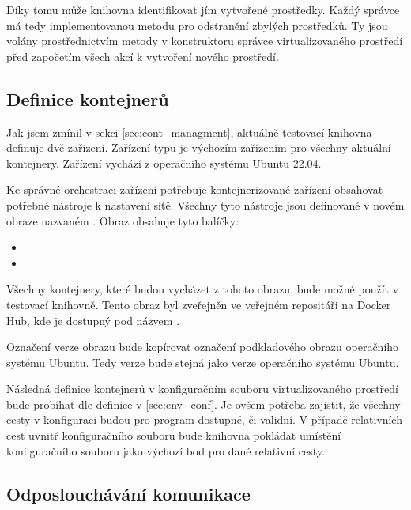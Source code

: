 Díky tomu může knihovna identifikovat jím vytvořené prostředky. Každý správce má tedy implementovanou metodu pro odstranění zbylých prostředků. Ty jsou volány prostřednictvím metody  v konstruktoru správce virtualizovaného prostředí před započetím všech akcí k vytvoření nového prostředí.

\subsection{Definice kontejnerů}

Jak jsem zmínil v sekci \ref{sec:cont_managment}, aktuálně testovací knihovna definuje dvě zařízení. Zařízení typu  je výchozím zařízením pro všechny aktuální kontejnery. Zařízení vychází z operačního systému Ubuntu 22.04. 

Ke správné orchestraci zařízení potřebuje kontejnerizované zařízení obsahovat potřebné nástroje k nastavení sítě. Všechny tyto nástroje jsou definované v novém obraze nazvaném . Obraz obsahuje tyto balíčky:

\begin{itemize}
    \item {}
    \item {}
\end{itemize}

Všechny kontejnery, které budou vycházet z tohoto obrazu, bude možné použít v testovací knihovně. Tento obraz byl zveřejněn ve veřejném repositáři na Docker Hub\cite{docker_hub}, kde je dostupný pod názvem .

Označení verze obrazu bude kopírovat označení podkladového obrazu operačního systému Ubuntu. Tedy verze bude stejná jako verze operačního systému Ubuntu. 

Následná definice kontejnerů v konfiguračním souboru virtualizovaného prostředí bude probíhat dle definice v \ref{sec:env_conf}. Je ovšem potřeba zajistit, že všechny cesty v konfiguraci budou pro program dostupné, či validní. V případě relativních cest uvnitř konfiguračního souboru bude knihovna pokládat umístění konfiguračního souboru jako výchozí bod pro dané relativní cesty.

\subsection{Odposlouchávání komunikace}

